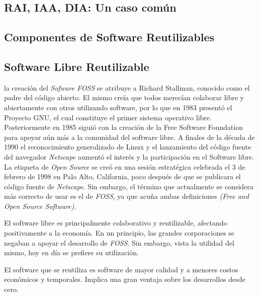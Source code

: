 \subsection{RAI, IAA, DIA: Un caso común}

\subsection{Componentes de Software Reutilizables}


\subsection{Software Libre Reutilizable}

la creación del \textit{Sofware FOSS} se atribuye a Richard Stallman, conocido como el padre del código abierto. El mismo creía que todos merecían colaborar libre y abiertamente con otros utilizando software, por lo que en 1983 presentó el Proyecto GNU, el cual constituye el primer sistema operativo libre. Posteriormente en 1985 siguió con la creación de la Free Software Foundation para apoyar aún más a la comunidad del software libre. A finales de la década de 1990 el reconocimiento generalizado de Linux y el lanzamiento del código fuente del navegador \textit{Netscape} aumentó el interés y la participación en el Software libre. La etiqueta de \textit{Open Source} se creó en una sesión estratégica celebrada el 3 de febrero de 1998 en Palo Alto, California, poco después de que se publicara el código fuente de \textit{Netscape}. Sin embargo, el término que actualmente se considera más correcto de usar es el de \textit{FOSS}, ya que acuña ambas definiciones \textit{(Free and Open Source Software)}. 

El software libre es principalmente colaborativo y reutilizable, afectando positivamente a la economía. En un principio, las grandes corporaciones se negaban a apoyar el desarrollo de \textit{FOSS}. Sin embargo, vista la utilidad del mismo, hoy en día se prefiere su utilización.

El software que se reutiliza es software de mayor calidad y a menores costos económicos y temporales. Implica una gran ventaja sobre los desarrollos desde cero.